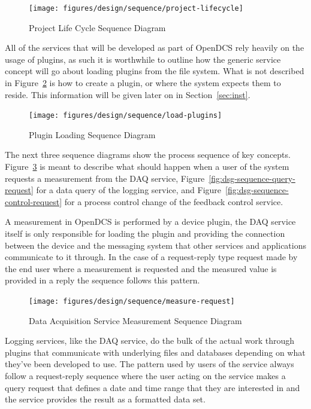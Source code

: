     \begin{figure}[H]
      \texttt{[image: figures/design/sequence/project-lifecycle]}
      \caption{Project Life Cycle Sequence Diagram}
      \label{fig:dsg-sequence-life-cycle}
    \end{figure}

    All of the services that will be developed as part of OpenDCS rely heavily
    on the usage of plugins, as such it is worthwhile to outline how the generic
    service concept will go about loading plugins from the file system. What is
    not described in Figure~\ref{fig:dsg-sequence-load-plugins} is how to create
    a plugin, or where the system expects them to reside. This information will
    be given later on in Section~\ref{sec:inst}.

    \begin{figure}[H]
      \texttt{[image: figures/design/sequence/load-plugins]}
      \caption{Plugin Loading Sequence Diagram}
      \label{fig:dsg-sequence-load-plugins}
    \end{figure}

    The next three sequence diagrams show the process sequence of key concepts.
		Figure~\ref{fig:dsg-sequence-measure-request} is meant to describe what
		should happen when a user of the system requests a measurement from the DAQ
    service, Figure~\ref{fig:dsg-sequence-query-request} for a data query of
    the logging service, and Figure~\ref{fig:dsg-sequence-control-request} for
    a process control change of the feedback control service.

    A measurement in OpenDCS is performed by a device plugin, the DAQ service
    itself is only responsible for loading the plugin and providing the
    connection between the device and the messaging system that other services
    and applications communicate to it through. In the case of a request-reply
    type request made by the end user where a measurement is requested and the
    measured value is provided in a reply the sequence follows this pattern.

    \begin{figure}[H]
      \texttt{[image: figures/design/sequence/measure-request]}
      \caption{Data Acquisition Service Measurement Sequence Diagram}
      \label{fig:dsg-sequence-measure-request}
    \end{figure}

    Logging services, like the DAQ service, do the bulk of the actual work
    through plugins that communicate with underlying files and databases
    depending on what they've been developed to use. The pattern used by users
    of the service always follow a request-reply sequence where the user acting
    on the service makes a query request that defines a date and time range that
    they are interested in and the service provides the result as a formatted
    data set.

